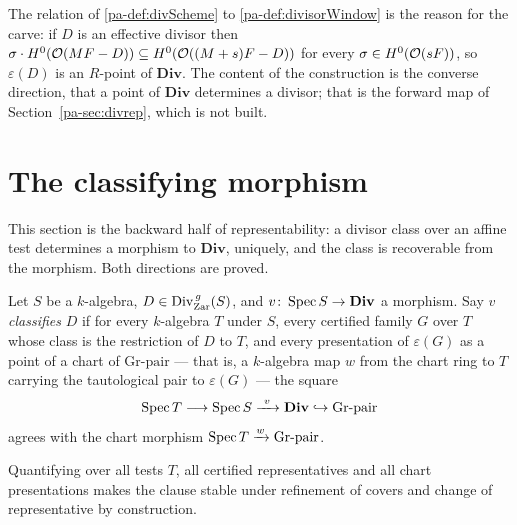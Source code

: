 The relation of \ref{pa-def:divScheme} to \ref{pa-def:divisorWindow} is the reason for the carve:
if \(D\) is an effective divisor then \(\sigma \cdot H^0(\mathcal{O}(MF - D)) \subseteq
H^0(\mathcal{O}((M+s)F - D))\) for every \(\sigma \in H^0(\mathcal{O}(sF))\), so \(\varepsilon(D)\) is an
\(R\)-point of \(\mathbf{Div}\). The content of the construction is the converse direction,
that a point of \(\mathbf{Div}\) determines a divisor; that is the forward map of
Section~\ref{pa-sec:divrep}, which is not built.

\section{The classifying morphism}
\label{pa-sec:divclassify}

This section is the backward half of representability: a divisor class over an affine test
determines a morphism to \(\mathbf{Div}\), uniquely, and the class is recoverable from the
morphism. Both directions are proved.

\begin{definition}
  \label{pa-def:isDivRepClassify}
  \leanok

  Let \(S\) be a \(k\)-algebra, \(D \in \operatorname{Div}^{\,g}_{\mathrm{Zar}}(S)\), and \(v \colon \operatorname{Spec}
  S \to \mathbf{Div}\) a morphism. Say \(v\) \emph{classifies} \(D\) if for every
  \(k\)-algebra \(T\) under \(S\), every certified family \(G\) over \(T\) whose class is
  the restriction of \(D\) to \(T\), and every presentation of \(\varepsilon(G)\) as a point
  of a chart of \(\mathrm{Gr}\text{-pair}\) --- that is, a \(k\)-algebra map \(w\) from the
  chart ring to \(T\) carrying the tautological pair to \(\varepsilon(G)\) --- the square
  \[
    \operatorname{Spec} T \longrightarrow \operatorname{Spec} S \xrightarrow{\ v\ } \mathbf{Div}
      \hookrightarrow \mathrm{Gr}\text{-pair}
  \]
  agrees with the chart morphism \(\operatorname{Spec} T \xrightarrow{w} \mathrm{Gr}\text{-pair}\).

  Quantifying over all tests \(T\), all certified representatives and all chart
  presentations makes the clause stable under refinement of covers and change of
  representative by construction.
\end{definition}

